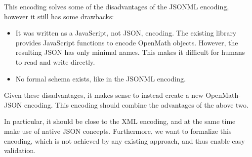 This encoding solves some of the disadvantages of the JSONML encoding, however it still has some drawbacks:

\begin{itemize}
    \item It was written as a JavaScript, not JSON, encoding.
    The existing library provides JavaScript functions to encode OpenMath objects. 
    However, the resulting JSON has only minimal names. 
    This makes it difficult for humans to read and write directly. 

    \item No formal schema exists, like in the JSONML encoding. 
\end{itemize}


Given these disadvantages, it makes sense to instead create a new OpenMath-JSON encoding. 
This encoding should combine the advantages of the above two. 

In particular, it should be close to the XML encoding, and at the same time make use of native JSON concepts. 
Furthermore, we want to formalize this encoding, which is not achieved by any existing approach, and thus enable easy validation. 